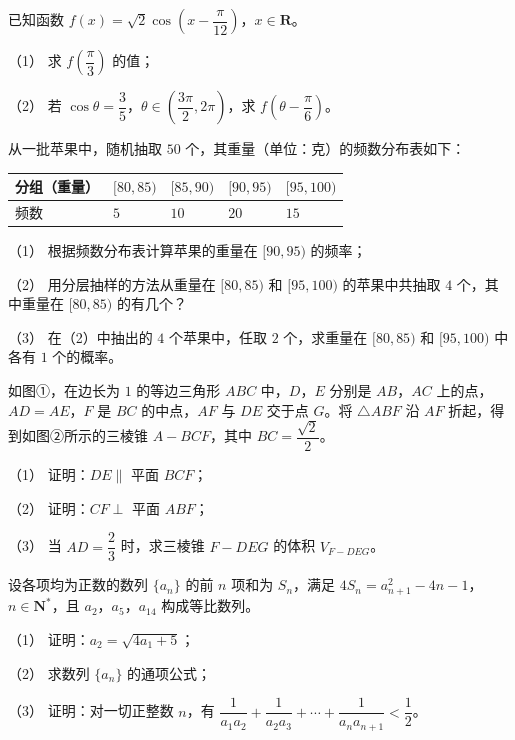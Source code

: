 \begin{question}
已知函数 $f(x)=\sqrt2\cos\left(x-\dfrac{\pi}{12}\right)$，$x\in\mathbf R$。

（1） 求 $f\left(\dfrac{\pi}3\right)$ 的值；

（2） 若 $\cos\theta=\dfrac35$，$\theta\in\left(\dfrac{3\pi}2,2\pi\right)$，求 $f\left(\theta-\dfrac{\pi}6\right)$。

\end{question}
\begin{question}
从一批苹果中，随机抽取 $50$ 个，其重量（单位：克）的频数分布表如下：

\begin{center}
\begin{tabular}{lllll}
\toprule
分组（重量） & $[80,85)$ & $[85,90)$ & $[90,95)$ & $[95,100)$ \\
\midrule
频数 & $5$ & $10$ & $20$ & $15$ \\
\bottomrule
\end{tabular}
\end{center}

（1） 根据频数分布表计算苹果的重量在 $[90,95)$ 的频率；

（2） 用分层抽样的方法从重量在 $[80,85)$ 和 $[95,100)$ 的苹果中共抽取 $4$ 个，其中重量在 $[80,85)$ 的有几个？

（3） 在（2）中抽出的 $4$ 个苹果中，任取 $2$ 个，求重量在 $[80,85)$ 和 $[95,100)$ 中各有 $1$ 个的概率。

\Needspace{0.4\textheight}
\end{question}
\begin{question}
如图①，在边长为 $1$ 的等边三角形 $ABC$ 中，$D$，$E$ 分别是 $AB$，$AC$ 上的点，$AD=AE$，$F$ 是 $BC$ 的中点，$AF$ 与 $DE$ 交于点 $G$。将 $\triangle ABF$ 沿 $AF$ 折起，得到如图②所示的三棱锥 $A-BCF$，其中 $BC=\dfrac{\sqrt2}2$。
\nopagebreak[4]
\begin{center}\end{center}
\nopagebreak[4]
\nopagebreak[4]
\begin{center}\end{center}
\nopagebreak[4]
（1） 证明：$DE\parallel$ 平面 $BCF$；

（2） 证明：$CF\perp$ 平面 $ABF$；

（3） 当 $AD=\dfrac23$ 时，求三棱锥 $F-DEG$ 的体积 $V_{F-DEG}$。

\end{question}
\begin{question}
设各项均为正数的数列 $\{a_n\}$ 的前 $n$ 项和为 $S_n$，满足 $4S_n=a_{n+1}^2-4n-1$，$n\in\mathbf N^*$，且 $a_2$，$a_5$，$a_{14}$ 构成等比数列。

（1） 证明：$a_2=\sqrt{4a_1+5}$；

（2） 求数列 $\{a_n\}$ 的通项公式；

（3） 证明：对一切正整数 $n$，有 $\dfrac1{a_1a_2}+\dfrac1{a_2a_3}+\cdots+\dfrac1{a_na_{n+1}}<\dfrac12$。

\end{question}
